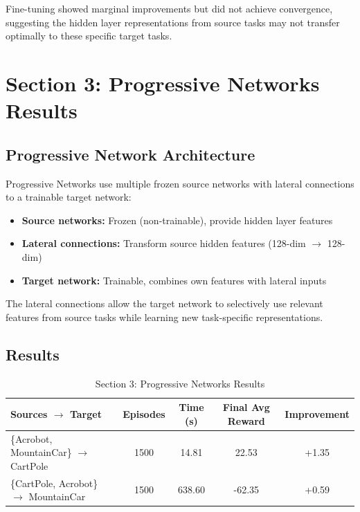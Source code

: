 \documentclass[11pt,a4paper]{article}
\begin{document}
Fine-tuning showed marginal improvements but did not achieve convergence, suggesting the hidden layer representations from source tasks may not transfer optimally to these specific target tasks.

\section{Section 3: Progressive Networks Results}

\subsection{Progressive Network Architecture}

Progressive Networks use multiple frozen source networks with lateral connections to a trainable target network:

\begin{itemize}
    \item \textbf{Source networks:} Frozen (non-trainable), provide hidden layer features
    \item \textbf{Lateral connections:} Transform source hidden features (128-dim $\rightarrow$ 128-dim)
    \item \textbf{Target network:} Trainable, combines own features with lateral inputs
\end{itemize}

The lateral connections allow the target network to selectively use relevant features from source tasks while learning new task-specific representations.

\subsection{Results}

\begin{table}[H]
\centering
\caption{Section 3: Progressive Networks Results}
\begin{tabular}{lcccc}
\toprule
\textbf{Sources $\rightarrow$ Target} & \textbf{Episodes} & \textbf{Time (s)} & \textbf{Final Avg Reward} & \textbf{Improvement} \\
\midrule
\{Acrobot, MountainCar\} $\rightarrow$ CartPole & 1500 & 14.81 & 22.53 & +1.35 \\
\{CartPole, Acrobot\} $\rightarrow$ MountainCar & 1500 & 638.60 & -62.35 & +0.59 \\
\bottomrule
\end{tabular}
\end{table}
\end{document}
